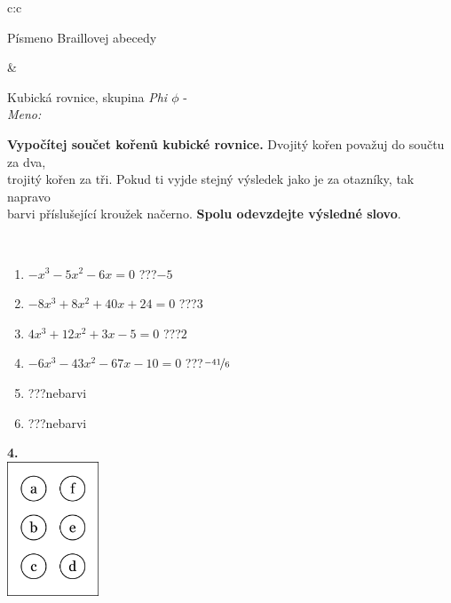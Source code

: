 \documentclass[10pt]{report}
\begin{document}
\begin{tabular}{c:c}
\begin{minipage}[c][104.5mm][t]{0.5\linewidth}
\begin{center}
\begin{minipage}{0.20\linewidth}
\begin{center}
{\small Písmeno Braillovej abecedy}
\end{center}
\end{minipage}
\end{center}
\end{minipage}
&
\begin{minipage}[c][104.5mm][t]{0.5\linewidth}
\begin{center}
\vspace{7mm}
{\huge Kubická rovnice, skupina \textit{Phi $\phi$} -}\\[5mm]
\textit{Meno:}\phantom{xxxxxxxxxxxxxxxxxxxxxxxxxxxxxxxxxxxxxxxxxxxxxxxxxxxxxxxxxxxxxxxxx}\\[5mm]
\begin{minipage}{0.95\linewidth}
\textbf{Vypočítej součet kořenů kubické rovnice.} Dvojitý kořen považuj do součtu za dva,\\trojitý kořen za tři. Pokud ti vyjde stejný výsledek jako je za otazníky, tak napravo\\barvi příslušející kroužek načerno. \textbf{Spolu odevzdejte výsledné slovo}.
\end{minipage}
\\[1mm]
\begin{minipage}{0.79\linewidth}
\begin{center}
\begin{varwidth}{\linewidth}
\begin{enumerate}
\Large
\item $-x^3-5x^2-6x=0$\quad \dotfill\; ???\;\dotfill \quad $-5$
\item $-8x^3+8x^2+40x+24=0$\quad \dotfill\; ???\;\dotfill \quad $3$
\item $4x^3+12x^2+3x-5=0$\quad \dotfill\; ???\;\dotfill \quad $2$
\item $-6x^3-43x^2-67x-10=0$\quad \dotfill\; ???\;\dotfill \quad $\nicefrac{-41}{6}$
\item \quad \dotfill\; ???\;\dotfill \quad nebarvi
\item \quad \dotfill\; ???\;\dotfill \quad nebarvi
\end{enumerate}
\end{varwidth}
\end{center}
\end{minipage}
\begin{minipage}{0.20\linewidth}
\begin{center}
{\Huge\bfseries 4.} \\[2mm]
\includegraphics[height=40mm]{../images/braille.png}

\end{center}
\end{minipage}
\end{center}
\end{minipage}
\end{tabular}
\end{document}

